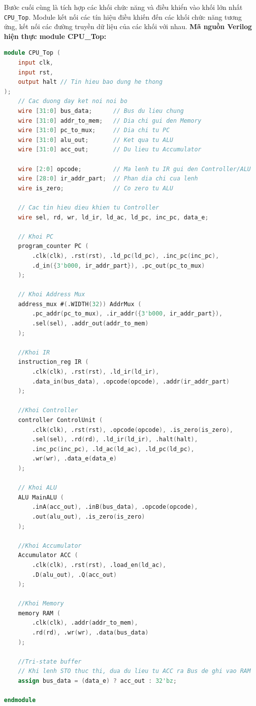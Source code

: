 
Bước cuối cùng là tích hợp các khối chức năng và điều khiển vào khối lớn nhất \texttt{CPU\_Top}. 
Module kết nối các tín hiệu điều khiến đến các khối chức năng tương ứng, kết nối các đường truyền dữ liệu của các khối với nhau.
\textbf{ Mã nguồn Verilog hiện thực module CPU\_Top:}

\begin{lstlisting}[language=Verilog, caption={CPU Top-level}]
module CPU_Top (
    input clk,
    input rst,
    output halt // Tin hieu bao dung he thong
);
    // Cac duong day ket noi noi bo 
    wire [31:0] bus_data;      // Bus du lieu chung
    wire [31:0] addr_to_mem;   // Dia chi gui den Memory
    wire [31:0] pc_to_mux;     // Dia chi tu PC
    wire [31:0] alu_out;       // Ket qua tu ALU
    wire [31:0] acc_out;       // Du lieu tu Accumulator 
    
    wire [2:0] opcode;         // Ma lenh tu IR gui den Controller/ALU
    wire [28:0] ir_addr_part;  // Phan dia chi cua lenh
    wire is_zero;              // Co zero tu ALU
    
    // Cac tin hieu dieu khien tu Controller
    wire sel, rd, wr, ld_ir, ld_ac, ld_pc, inc_pc, data_e;

    // Khoi PC
    program_counter PC (
        .clk(clk), .rst(rst), .ld_pc(ld_pc), .inc_pc(inc_pc),
        .d_in({3'b000, ir_addr_part}), .pc_out(pc_to_mux)
    );

    // Khoi Address Mux
    address_mux #(.WIDTH(32)) AddrMux (
        .pc_addr(pc_to_mux), .ir_addr({3'b000, ir_addr_part}),
        .sel(sel), .addr_out(addr_to_mem)
    );

    //Khoi IR
    instruction_reg IR (
        .clk(clk), .rst(rst), .ld_ir(ld_ir),
        .data_in(bus_data), .opcode(opcode), .addr(ir_addr_part)
    );

    //Khoi Controller
    controller ControlUnit (
        .clk(clk), .rst(rst), .opcode(opcode), .is_zero(is_zero),
        .sel(sel), .rd(rd), .ld_ir(ld_ir), .halt(halt),
        .inc_pc(inc_pc), .ld_ac(ld_ac), .ld_pc(ld_pc),
        .wr(wr), .data_e(data_e)
    );

    // Khoi ALU
    ALU MainALU (
        .inA(acc_out), .inB(bus_data), .opcode(opcode),
        .out(alu_out), .is_zero(is_zero)
    );

    //Khoi Accumulator
    Accumulator ACC (
        .clk(clk), .rst(rst), .load_en(ld_ac),
        .D(alu_out), .Q(acc_out)
    );

    //Khoi Memory
    memory RAM (
        .clk(clk), .addr(addr_to_mem),
        .rd(rd), .wr(wr), .data(bus_data)
    );

    //Tri-state buffer
    // Khi lenh STO thuc thi, dua du lieu tu ACC ra Bus de ghi vao RAM
    assign bus_data = (data_e) ? acc_out : 32'bz;

endmodule
\end{lstlisting}

